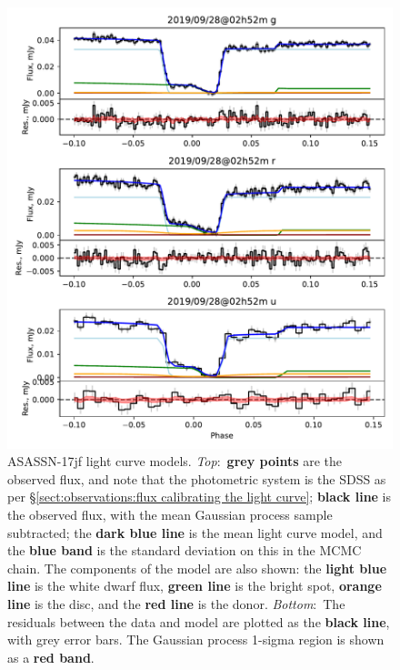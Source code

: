 \begin{figure}
    \centering
    \includegraphics[width=\textwidth]{figures/results/three_cvs_with_weird_colours/ASASSN-17jf/ASASSN-17jf_1.pdf}
    \caption{ASASSN-17jf light curve models. {\it Top}:~{\bf grey points} are the observed flux, and note that the photometric system is the SDSS as per \S\ref{sect:observations:flux calibrating the light curve}; {\bf black line} is the observed flux, with the mean Gaussian process sample subtracted; the {\bf dark blue line} is the mean light curve model, and the {\bf blue band} is the standard deviation on this in the MCMC chain. The components of the model are also shown: the {\bf light blue line} is the white dwarf flux, {\bf green line} is the bright spot, {\bf orange line} is the disc, and the {\bf red line} is the donor. {\it Bottom}:~The residuals between the data and model are plotted as the {\bf black line}, with grey error bars. The Gaussian process 1-sigma region is shown as a {\bf red band}.}
    \label{fig:ASASSN-17jf all light curves}
\end{figure}
